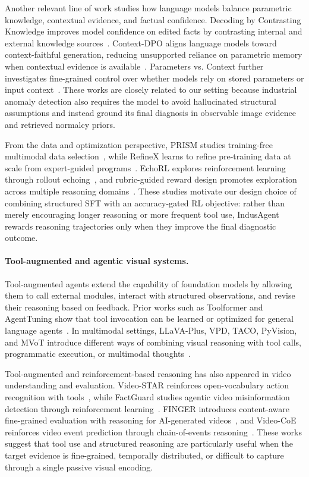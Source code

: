 \documentclass{article}
\begin{document}
{Another relevant line of work studies how language models balance parametric knowledge, contextual evidence, and factual confidence. Decoding by Contrasting Knowledge improves model confidence on edited facts by contrasting internal and external knowledge sources~\citep{bi2024decoding}. Context-DPO aligns language models toward context-faithful generation, reducing unsupported reliance on parametric memory when contextual evidence is available~\citep{bi2024context}. Parameters vs. Context further investigates fine-grained control over whether models rely on stored parameters or input context~\citep{bi2025parameters}. These works are closely related to our setting because industrial anomaly detection also requires the model to avoid hallucinated structural assumptions and instead ground its final diagnosis in observable image evidence and retrieved normalcy priors.

From the data and optimization perspective, PRISM studies training-free multimodal data selection~\citep{Bi2025PRISMSI}, while RefineX learns to refine pre-training data at scale from expert-guided programs~\citep{bi2025refinex}. EchoRL explores reinforcement learning through rollout echoing~\citep{bi2026echorl}, and rubric-guided reward design promotes exploration across multiple reasoning domains~\citep{bi2025reward}. These studies motivate our design choice of combining structured SFT with an accuracy-gated RL objective: rather than merely encouraging longer reasoning or more frequent tool use, IndusAgent rewards reasoning trajectories only when they improve the final diagnostic outcome.

\paragraph{Tool-augmented and agentic visual systems.}
Tool-augmented agents extend the capability of foundation models by allowing them to call external modules, interact with structured observations, and revise their reasoning based on feedback. Prior works such as Toolformer and AgentTuning show that tool invocation can be learned or optimized for general language agents~\citep{schick2024toolformer, zeng2024agenttuning}. In multimodal settings, LLaVA-Plus, VPD, TACO, PyVision, and MVoT introduce different ways of combining visual reasoning with tool calls, programmatic execution, or multimodal thoughts~\citep{liu2023llavapluslearningusetools, hu2024visual, ma2024taco, zhao2025pyvision, li2025MVoT}. 

Tool-augmented and reinforcement-based reasoning has also appeared in video understanding and evaluation. Video-STAR reinforces open-vocabulary action recognition with tools~\citep{yuan2025video}, while FactGuard studies agentic video misinformation detection through reinforcement learning~\citep{li2026factguard}. FINGER introduces content-aware fine-grained evaluation with reasoning for AI-generated videos~\citep{chen2025finger}, and Video-CoE reinforces video event prediction through chain-of-events reasoning~\citep{su2026video}. These works suggest that tool use and structured reasoning are particularly useful when the target evidence is fine-grained, temporally distributed, or difficult to capture through a single passive visual encoding.

}
\end{document}
